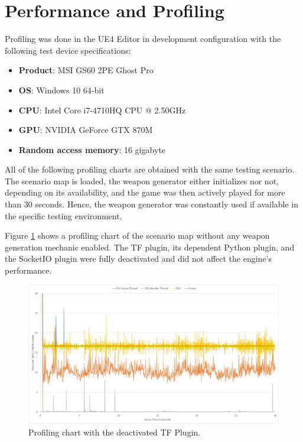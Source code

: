 \documentclass[MGS,Master,english]{twbook}%
\begin{document}
\section{Performance and Profiling}
Profiling was done in the \ac{UE4} Editor in development configuration with the following test device specifications:
\begin{itemize}
	\item \textbf{Product}: MSI GS60 2PE Ghost Pro
	\item \textbf{\ac{OS}}: Windows 10 64-bit
	\item \textbf{\ac{CPU}}: Intel Core i7-4710HQ \ac{CPU} @ 2.50GHz
	\item \textbf{\ac{GPU}}: NVIDIA GeForce GTX 870M
	\item \textbf{Random access memory}: 16 gigabyte
\end{itemize}

All of the following profiling charts are obtained with the same testing scenario. The scenario map is loaded, the weapon generator either initializes nor not, depending on its availability, and the game was then actively played for more than 30 seconds. Hence, the weapon generator was constantly used if available in the specific testing environment. 

Figure \ref{scenario::profiling_noTF} shows a profiling chart of the scenario map without any weapon generation mechanic enabled. The \ac{TF} plugin, its dependent Python plugin, and the SocketIO plugin were fully deactivated and did not affect the engine’s performance.
\begin{figure}[!ht]
	\centering
	\includegraphics[width=1.0\linewidth]{PICs/Profiling/deactivated_plugin}
	\caption{Profiling chart with the deactivated \ac{TF} Plugin.} \label{scenario::profiling_noTF}
\end{figure}
\end{document}
